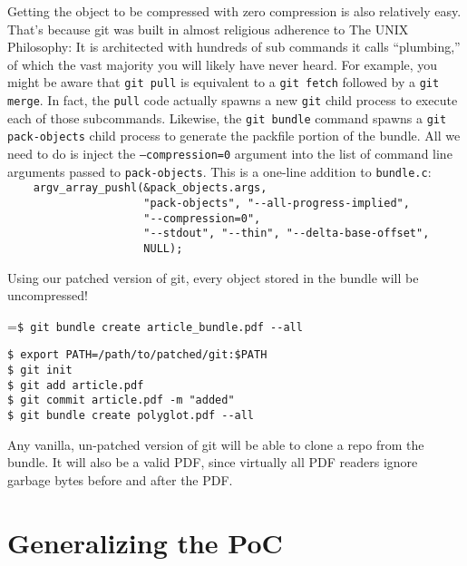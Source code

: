 \documentclass{article}
\begin{document}
Getting the object to be compressed with zero compression is also
relatively easy.  That's because git was built in almost religious
adherence to The UNIX Philosophy: It is architected with hundreds of
sub commands it calls ``plumbing,'' of which the vast majority you
will likely have never heard. For example, you might be aware
that \texttt{git pull} is equivalent to a \texttt{git fetch} followed
by a \texttt{git merge}. In fact, the \texttt{pull} code actually
spawns a new \texttt{git} child process to execute each of those
subcommands. Likewise, the \texttt{git bundle} command spawns
a \texttt{git pack-objects} child process to generate the packfile
portion of the bundle.  All we need to do is inject
the \texttt{--compression=0} argument into the list of command line
arguments passed to \texttt{pack-objects}.  This is a one-line
addition to \texttt{bundle.c}:\\ {\footnotesize {\color{gray}
\verb|    argv_array_pushl(&pack_objects.args,|\\
\verb|                     "pack-objects", "--all-progress-implied",|}\\
\verb|                     "--compression=0",|\\
{\color{gray}
\verb|                     "--stdout", "--thin", "--delta-base-offset",|\\
\verb|                     NULL);|
}}

Using our patched version of git, every object stored in the bundle
will be uncompressed!
\begin{center}
\begingroup
{}=\hbox{\footnotesize\verb|$ git bundle create article_bundle.pdf --all|}
\begin{minipage}{\wd9}
\footnotesize\begin{verbatim}
$ export PATH=/path/to/patched/git:$PATH
$ git init
$ git add article.pdf
$ git commit article.pdf -m "added"
$ git bundle create polyglot.pdf --all
\end{verbatim}
\end{minipage}
\endgroup
\end{center}
Any vanilla, un-patched version of git will be able to clone a repo
from the bundle. It will also be a valid PDF, since virtually all
PDF readers ignore garbage bytes before and after the PDF.

\section{Generalizing the PoC}
\end{document}

